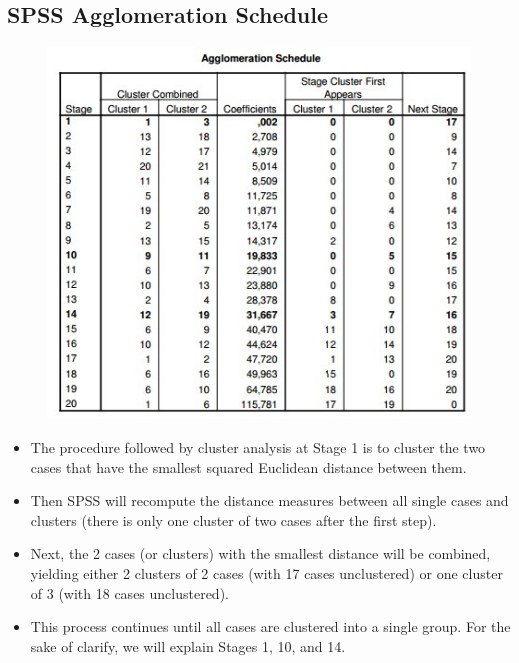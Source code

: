 \subsection{SPSS Agglomeration Schedule}
\begin{center}
	\begin{figure}[h!]
		\includegraphics[scale=1.1]{images/AggloSc}\\
	\end{figure}
\end{center}
\begin{itemize}
	\item The procedure followed by cluster analysis at Stage 1 is to cluster the two cases that have the smallest
	squared Euclidean distance between them.
	\item  Then SPSS will recompute the distance measures between all
	single cases and clusters (there is only one cluster of two cases after the first step). 
	\item Next, the 2 cases (or
	clusters) with the smallest distance will be combined, yielding either 2 clusters of 2 cases (with 17 cases
	unclustered) or one cluster of 3 (with 18 cases unclustered). 
	\item  This process continues until all cases are clustered into a single group.
	For the sake of clarify, we will explain Stages 1, 10, and 14.
\end{itemize}




